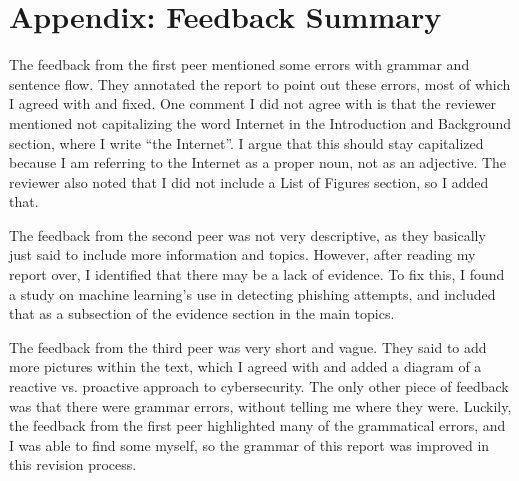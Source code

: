 \section*{Appendix: Feedback Summary}
The feedback from the first peer mentioned some errors with grammar and sentence flow.
They annotated the report to point out these errors, most of which I agreed with and fixed.
One comment I did not agree with is that the reviewer mentioned not capitalizing the word Internet in the Introduction and Background section, where I write ``the Internet''.
I argue that this should stay capitalized because I am referring to the Internet as a proper noun, not as an adjective.
The reviewer also noted that I did not include a List of Figures section, so I added that.

The feedback from the second peer was not very descriptive, as they basically just said to include more information and topics.
However, after reading my report over, I identified that there may be a lack of evidence.
To fix this, I found a study on machine learning's use in detecting phishing attempts, and included that as a subsection of the evidence section in the main topics.

The feedback from the third peer was very short and vague.
They said to add more pictures within the text, which I agreed with and added a diagram of a reactive vs. proactive approach to cybersecurity.
The only other piece of feedback was that there were grammar errors, without telling me where they were.
Luckily, the feedback from the first peer highlighted many of the grammatical errors, and I was able to find some myself, so the grammar of this report was improved in this revision process.
